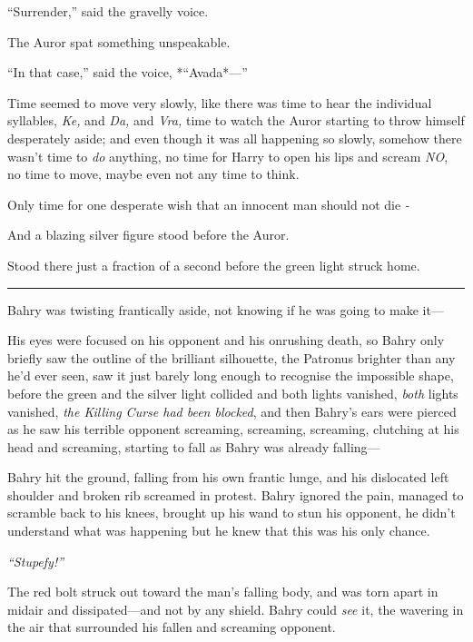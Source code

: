 ``Surrender,'' said the gravelly voice.

The Auror spat something unspeakable.

``In that case,'' said the voice, *``Avada*---''

Time seemed to move very slowly, like there was time to hear the
individual syllables, \emph{Ke,} and \emph{Da,} and \emph{Vra,} time to
watch the Auror starting to throw himself desperately aside; and even
though it was all happening so slowly, somehow there wasn't time to
\emph{do} anything, no time for Harry to open his lips and scream
\emph{NO}, no time to move, maybe even not any time to think.

Only time for one desperate wish that an innocent man should not die
\emph{-}

And a blazing silver figure stood before the Auror.

Stood there just a fraction of a second before the green light struck
home.

\begin{center}\rule{3in}{0.4pt}\end{center}

Bahry was twisting frantically aside, not knowing if he was going to
make it---

His eyes were focused on his opponent and his onrushing death, so Bahry
only briefly saw the outline of the brilliant silhouette, the Patronus
brighter than any he'd ever seen, saw it just barely long enough to
recognise the impossible shape, before the green and the silver light
collided and both lights vanished, \emph{both} lights vanished,
\emph{the Killing Curse had been blocked}, and then Bahry's ears were
pierced as he saw his terrible opponent screaming, screaming, screaming,
clutching at his head and screaming, starting to fall as Bahry was
already falling---

Bahry hit the ground, falling from his own frantic lunge, and his
dislocated left shoulder and broken rib screamed in protest. Bahry
ignored the pain, managed to scramble back to his knees, brought up his
wand to stun his opponent, he didn't understand what was happening but
he knew that this was his only chance.

\emph{``Stupefy!''}

The red bolt struck out toward the man's falling body, and was torn
apart in midair and dissipated---and not by any shield. Bahry could
\emph{see} it, the wavering in the air that surrounded his fallen and
screaming opponent.

